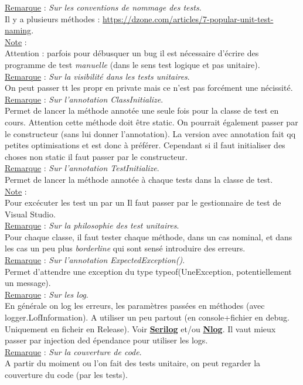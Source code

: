 \documentclass[a4paper,12pt,twoside]{article}
\newcommand{\urlcolor}{magenta}  %
\newcommand{\keycolor}{purple} %
\newcommand{\incode}[1]{{\footnotesize\ttfamily #1}} %
\newcommand{\rem}[2]{\noindent\underline{Remarque} : \textit{#1}.\\ \indent #2}
\newcommand{\note}[1]{\noindent\underline{Note} : \\ \indent #1}
\newcommand{\keyref}[2]{\hypersetup{urlcolor=\keycolor} \href{#1}{\textbf{#2}}\hypersetup{urlcolor=\urlcolor}}
\begin{document}
\rem{Sur les conventions de nommage des tests}{Il y a plusieurs méthodes : \url{https://dzone.com/articles/7-popular-unit-test-naming}.}\\

\note{Attention : parfois pour débusquer un bug il est nécessaire d'écrire des programme de test \textit{manuelle} (dans le sens test logique et pas unitaire).}\\

\rem{Sur la visibilité dans les tests unitaires}{On peut passer tt les propr en private mais ce n'est pas forcément une nécissité.}\\

\rem{Sur l'annotation ClassInitialize}{Permet de lancer la méthode annotée une seule fois pour la classe de test en cours. Attention cette méthode doit être static. On pourrait également passer par le constructeur (sans lui donner l'annotation). La version avec annotation fait qq petites optimisations et est donc à préférer. Cependant si il faut initialiser des choses non static il faut passer par le constructeur.}\\

\rem{Sur l'annotation TestInitialize}{Permet de lancer la méthode annotée à chaque tests dans la classe de test.}\\

\note{Pour excécuter les test un par un Il faut passer par le gestionnaire de test de Visual Studio.}\\

\rem{Sur la philosophie des test unitaires}{Pour chaque classe, il faut tester chaque méthode, dans un cas nominal, et dans les cas un peu plus \textit{borderline} qui sont sensé introduire des erreurs.}\\

\rem{Sur l'annotation ExpectedException()}{Permet d'attendre une exception du type typeof(UneException, potentiellement un message).}\\

\rem{Sur les log}{En générale on log les erreurs, les paramètres passées en méthodes (avec \incode{logger.LofInformation}). A utiliser un peu partout (en console+fichier en debug. Uniquement en ficheir en Release). Voir \keyref{https://serilog.net/}{Serilog} et/ou \keyref{https://nlog-project.org/}{Nlog}. Il vaut mieux passer par injection ded épendance pour utiliser les logs.}\\

\rem{Sur la couverture de code}{A partir du moiment ou l'on fait des tests unitaire, on peut regarder la couverture du code (par les tests).}\\
\end{document}
